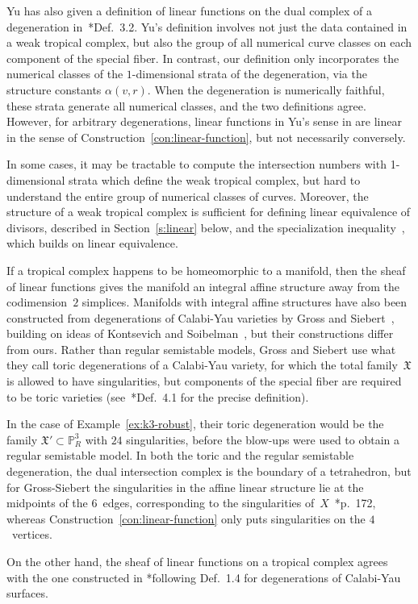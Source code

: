 \documentclass[11pt,reqno]{amsart}
\theoremstyle{definition}
\newcommand{\PP}{\mathbb P}
\newcommand{\X}{\mathfrak X}
\begin{document}
\begin{rmk}\label{r:yu-linear}
Yu has also given a definition of linear functions on the dual complex of a
degeneration in~\cite{yu-compactness}*{Def.~3.2}. Yu's definition involves not
just the data contained in a weak tropical complex, but also the group of all
numerical curve classes on each component of the special fiber. In contrast, our
definition only incorporates the numerical classes of the $1$-dimensional strata
of the degeneration, via the structure constants $\alpha(v,r)$. When the
degeneration is numerically faithful, these strata generate all numerical
classes, and the two definitions agree. However, for arbitrary degenerations,
linear functions in Yu's sense in are linear in the sense of
Construction~\ref{con:linear-function}, but not necessarily conversely.

In some cases, it may be tractable to compute the intersection numbers with
1-dimensional strata which define the weak tropical complex, but hard to
understand the entire group of numerical classes of curves. Moreover, the
structure of a weak tropical complex is sufficient for defining linear
equivalence of divisors, described in Section~\ref{s:linear} below, and the
specialization inequality~\cite{cartwright-specialization}, which builds on
linear equivalence.
\end{rmk}

\begin{rmk}\label{r:gross-siebert}
If a tropical complex happens to be homeomorphic to a manifold, then the sheaf
of linear functions gives the manifold an integral affine structure away from
the codimension~$2$ simplices. Manifolds with integral affine structures have
also been constructed from degenerations of Calabi-Yau varieties by Gross and
Siebert~\cite{gross-siebert}, building on ideas of Kontsevich and
Soibelman~\cite{kontsevich-soibelman}, but their constructions differ from ours.
Rather than regular semistable models, Gross and Siebert use what they call
toric degenerations of a Calabi-Yau variety, for which the total family~$\X$ is
allowed to have singularities, but components of the special fiber are required
to be toric varieties (see~\cite{gross-siebert}*{Def.~4.1} for the precise
definition).

In the case of Example~\ref{ex:k3-robust}, their toric degeneration would be the
family $\X' \subset \PP^3_R$ with $24$ singularities, before the
blow-ups were used to obtain a regular semistable model. In both the toric and
the regular semistable degeneration, the dual intersection complex is the
boundary of a tetrahedron, but for Gross-Siebert the singularities in the affine
linear structure lie at the midpoints of the $6$~edges, corresponding to the
singularities of~$X$~\cite{gross-siebert}*{p.~172}, whereas
Construction~\ref{con:linear-function} only puts singularities on the
$4$~vertices.

On the other hand, the sheaf of linear functions on a tropical complex agrees
with the one constructed in \cite{ghk}*{following Def.~1.4} for degenerations of
Calabi-Yau surfaces.
\end{rmk}
\end{document}
